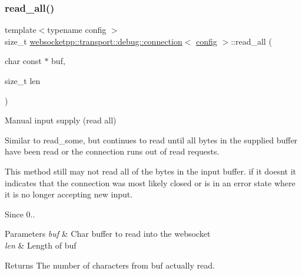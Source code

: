 \subsubsection{\texorpdfstring{read\+\_\+all()}{read\_all()}}
{\footnotesize\ttfamily template$<$typename config $>$ \\
size\+\_\+t \mbox{\hyperlink{classwebsocketpp_1_1transport_1_1debug_1_1connection}{websocketpp\+::transport\+::debug\+::connection}}$<$ \mbox{\hyperlink{classconfig}{config}} $>$\+::read\+\_\+all (\begin{DoxyParamCaption}\item[{char const $\ast$}]{buf,  }\item[{size\+\_\+t}]{len }\end{DoxyParamCaption})\hspace{0.3cm}{\ttfamily [inline]}}



Manual input supply (read all) 

Similar to read\+\_\+some, but continues to read until all bytes in the supplied buffer have been read or the connection runs out of read requests.

This method still may not read all of the bytes in the input buffer. if it doesn\textquotesingle{}t it indicates that the connection was most likely closed or is in an error state where it is no longer accepting new input.

\begin{DoxySince}{Since}
0..
\end{DoxySince}

\begin{DoxyParams}{Parameters}
{\em buf} & Char buffer to read into the websocket \\
\hline
{\em len} & Length of buf \\
\hline
\end{DoxyParams}
\begin{DoxyReturn}{Returns}
The number of characters from buf actually read. 
\end{DoxyReturn}
\mbox{\label{classwebsocketpp_1_1transport_1_1debug_1_1connection_affdbe8c6860526e66b651ddd402f9cf3}} 
